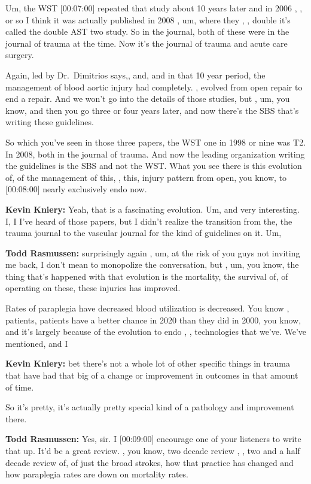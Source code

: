 \documentclass[
]{book}
\begin{document}
Um, the WST {[}00:07:00{]} repeated that study about 10 years later and in
2006 , , or so I think it was actually published in 2008 , um, where
they , , double it's called the double AST two study. So in the journal,
both of these were in the journal of trauma at the time. Now it's the
journal of trauma and acute care surgery.

Again, led by Dr.~Dimitrios says,, and, and in that 10 year period, the
management of blood aortic injury had completely. , evolved from open
repair to end a repair. And we won't go into the details of those
studies, but , um, you know, and then you go three or four years later,
and now there's the SBS that's writing these guidelines.

So which you've seen in those three papers, the WST one in 1998 or nine
was T2. In 2008, both in the journal of trauma. And now the leading
organization writing the guidelines is the SBS and not the WST. What you
see there is this evolution of, of the management of this, , this,
injury pattern from open, you know, to {[}00:08:00{]} nearly exclusively
endo now.

\textbf{Kevin Kniery:} Yeah, that is a fascinating evolution. Um, and very
interesting. I, I I've heard of those papers, but I didn't realize the
transition from the, the trauma journal to the vascular journal for the
kind of guidelines on it. Um,

\textbf{Todd Rasmussen:} surprisingly again , um, at the risk of you guys not
inviting me back, I don't mean to monopolize the conversation, but , um,
you know, the thing that's happened with that evolution is the
mortality, the survival of, of operating on these, these injuries has
improved.

Rates of paraplegia have decreased blood utilization is decreased. You
know , patients, patients have a better chance in 2020 than they did in
2000, you know, and it's largely because of the evolution to endo , ,
technologies that we've. We've mentioned, and I

\textbf{Kevin Kniery:} bet there's not a whole lot of other specific things
in trauma that have had that big of a change or improvement in outcomes
in that amount of time.

So it's pretty, it's actually pretty special kind of a pathology and
improvement there.

\textbf{Todd Rasmussen:} Yes, sir. I {[}00:09:00{]} encourage one of your
listeners to write that up. It'd be a great review. , you know, two
decade review , , two and a half decade review of, of just the broad
strokes, how that practice has changed and how paraplegia rates are down
on mortality rates.
\end{document}

